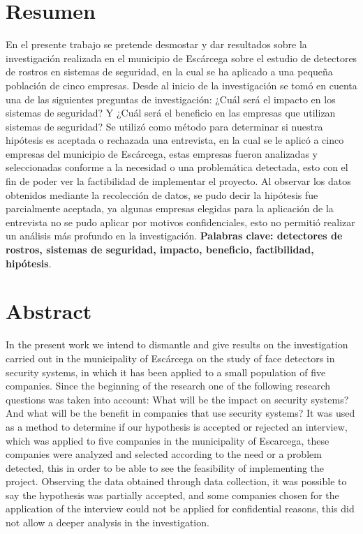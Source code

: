 \documentclass[12pt] {report}
\begin{document}
\section{Resumen}
En el presente trabajo  se pretende desmostar y dar resultados sobre la investigación realizada en el municipio de Escárcega sobre el estudio de detectores de rostros en sistemas de seguridad, en la cual se ha aplicado a una pequeña población de cinco empresas. Desde al inicio de la investigación se tomó en cuenta una de las siguientes  preguntas de investigación: ¿Cuál será el impacto en los sistemas de seguridad? Y ¿Cuál será el beneficio en las empresas que utilizan sistemas de seguridad?
Se utilizó como método para determinar si nuestra hipótesis es aceptada o rechazada una entrevista, en la cual se le aplicó a cinco empresas del municipio de Escárcega, estas empresas fueron analizadas y seleccionadas conforme a la necesidad o una problemática detectada, esto con el fin de poder ver la factibilidad de implementar el proyecto.
Al observar los datos obtenidos mediante la recolección de datos, se pudo decir la hipótesis fue parcialmente aceptada, ya algunas empresas elegidas para la aplicación de la entrevista no se pudo aplicar por motivos confidenciales, esto no permitió realizar un análisis más profundo en la investigación.
\textbf{\small Palabras clave: detectores de rostros, sistemas de seguridad, impacto, beneficio, factibilidad, hipótesis}.\\
\section{Abstract}

In the present work we intend to dismantle and give results on the investigation carried out in the municipality of Escárcega on the study of face detectors in security systems, in which it has been applied to a small population of five companies. Since the beginning of the research one of the following research questions was taken into account: What will be the impact on security systems? And what will be the benefit in companies that use security systems?
It was used as a method to determine if our hypothesis is accepted or rejected an interview, which was applied to five companies in the municipality of Escarcega, these companies were analyzed and selected according to the need or a problem detected, this in order to be able to see the feasibility of implementing the project.
Observing the data obtained through data collection, it was possible to say the hypothesis was partially accepted, and some companies chosen for the application of the interview could not be applied for confidential reasons, this did not allow a deeper analysis in the investigation.
\\
\end{document}
